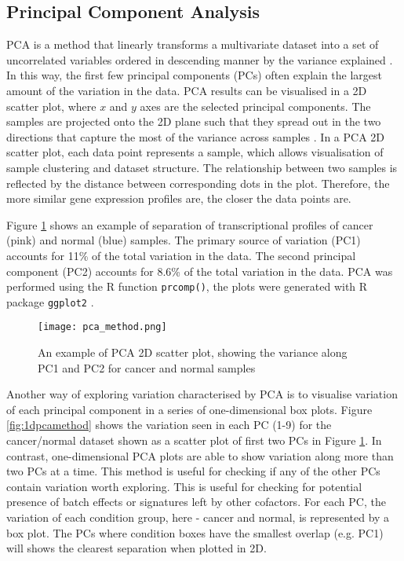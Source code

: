     \subsection{Principal Component Analysis}
    
    PCA is a method that linearly transforms a multivariate dataset into a set of uncorrelated variables ordered in descending manner by the variance explained \cite{jolliffe2002principal}. In this way, the first few principal components (PCs) often explain the largest amount of the variation in the data. PCA results can be visualised in a 2D scatter plot, where $x$ and $y$ axes are the selected principal components. The samples are projected onto the 2D plane such that they spread out in the two directions that capture the most of the variance across samples \cite{Love2016RNA-SeqApproved}. 
    In a PCA 2D scatter plot, each data point represents a sample, which allows visualisation of sample clustering and dataset structure.  The relationship between two samples is reflected by the distance between corresponding dots in the plot. Therefore, the more similar gene expression profiles are, the closer the data points are.    
   
    Figure \ref{fig:pcamethod} shows an example of separation of transcriptional profiles of cancer (pink) and normal (blue) samples. The primary source of variation (PC1) accounts for 11\% of the total variation in the data. The second principal component (PC2) accounts for 8.6\% of the total variation in the data. PCA was performed using the R function \texttt{prcomp()}, the plots were generated with R package \texttt{ggplot2} \cite{ggplot2}.
    
            \begin{figure}[h]
            \centering
            \texttt{[image: pca\_method.png]}
            \caption{An example of PCA 2D scatter plot, showing the variance along PC1 and PC2 for cancer and normal samples}
            \label{fig:pcamethod}
            \end{figure}
        
    \newpage
    Another way of exploring variation characterised by PCA is to visualise variation of each principal component in a series of one-dimensional box plots. Figure \ref{fig:1dpcamethod} shows the variation seen in each PC (1-9) for the cancer/normal dataset shown as a scatter plot of first two PCs in Figure \ref{fig:pcamethod}. 
    In contrast, one-dimensional PCA plots are able to show variation along more than two PCs at a time. This method is useful for checking if any of the other PCs contain variation worth exploring. This is useful for checking for potential presence of batch effects or signatures left by other cofactors. 
    For each PC, the variation of each condition group, here - cancer and normal, is represented by a box plot. The PCs where condition boxes have the smallest overlap (e.g. PC1) will shows the clearest separation when plotted in 2D. 
       
